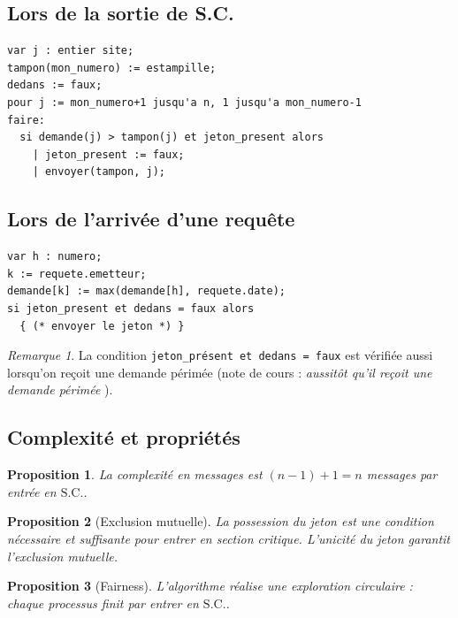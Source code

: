 \documentclass[12pt,a4paper]{article}
\theoremstyle{definition}
\theoremstyle{plain}
\newtheorem{proposition}{Proposition}[section]
\theoremstyle{remark}
\newtheorem{remarque}{Remarque}[section]
\newcommand{\SC}{\text{S.C.}}
\begin{document}
\subsection{Lors de la sortie de S.C.}

\begin{lstlisting}[caption={Sortie de section critique}]
var j : entier site;
tampon(mon_numero) := estampille;
dedans := faux;
pour j := mon_numero+1 jusqu'a n, 1 jusqu'a mon_numero-1
faire:
  si demande(j) > tampon(j) et jeton_present alors
    | jeton_present := faux;
    | envoyer(tampon, j);
\end{lstlisting}

\subsection{Lors de l'arrivée d'une requête}

\begin{lstlisting}[caption={Réception d'une requête}]
var h : numero;
k := requete.emetteur;
demande[k] := max(demande[h], requete.date);
si jeton_present et dedans = faux alors
  { (* envoyer le jeton *) }
\end{lstlisting}

\begin{remarque}
  La condition \texttt{jeton\_présent et dedans = faux} est vérifiée
  aussi lorsqu'on reçoit une demande \og périmée \fg{} (note de cours :
  \emph{aussitôt qu'il reçoit une demande \og périmée \fg{}}).
\end{remarque}

\subsection{Complexité et propriétés}

\begin{proposition}
  La complexité en messages est $(n-1)+1 = n$ messages par entrée en $\SC$.
\end{proposition}

\begin{proposition}[Exclusion mutuelle]
  La possession du jeton est une condition \emph{nécessaire et suffisante}
  pour entrer en section critique. L'unicité du jeton garantit l'exclusion mutuelle.
\end{proposition}

\begin{proposition}[Fairness]
  L'algorithme réalise une \emph{exploration circulaire} : chaque processus
  finit par entrer en $\SC$.
\end{proposition}
\end{document}
